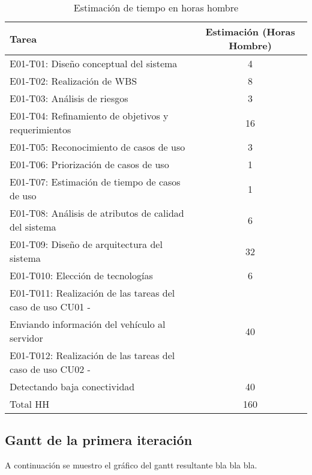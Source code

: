 \begin{table}[htb]
\begin{center}
\begin{tabular}{|l|c|}
\hline
Tarea & Estimación (Horas Hombre) \\
\hline \hline
E01-T01: Diseño conceptual del sistema & 4 \\ \hline
E01-T02: Realización de WBS & 8 \\ \hline
E01-T03: Análisis de riesgos & 3 \\ \hline
E01-T04: Refinamiento de objetivos y requerimientos & 16 \\ \hline
E01-T05: Reconocimiento de casos de uso & 3 \\ \hline
E01-T06: Priorización de casos de uso & 1 \\ \hline
E01-T07: Estimación de tiempo de casos de uso & 1 \\ \hline
E01-T08: Análisis de atributos de calidad del sistema & 6 \\ \hline
E01-T09: Diseño de arquitectura del sistema & 32 \\ \hline
E01-T010: Elección de tecnologías & 6 \\ \hline
E01-T011: Realización de las tareas del caso de uso CU01 - \\ Enviando información del vehículo al servidor & 40 \\ \hline
E01-T012: Realización de las tareas del caso de uso CU02 - \\ Detectando baja conectividad & 40 \\ \hline
Total HH & 160 \\ \hline
\end{tabular}
\caption{Estimación de tiempo en horas hombre}
\label{tabla:sencilla}
\end{center}
\end{table}


\subsection{Gantt de la primera iteración}

A continuación se muestro el gráfico del gantt resultante bla bla bla.


